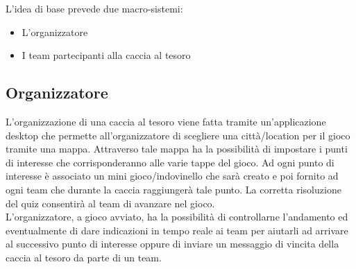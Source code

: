 \documentclass[12pt, english]{report}
\begin{document}
L’idea di base prevede due macro-sistemi:\\
\begin{itemize}
	\item L'organizzatore
	\item I team partecipanti alla caccia al tesoro
\end{itemize}

\subsection*{Organizzatore}
L’organizzazione di una caccia al tesoro viene fatta tramite un’applicazione desktop che permette all'organizzatore di scegliere una città/location per il gioco tramite una mappa. Attraverso tale mappa ha la possibilità di impostare i punti di interesse che corrisponderanno alle varie tappe del gioco. Ad ogni punto di interesse è associato un mini gioco/indovinello che sarà creato e poi fornito ad ogni team che durante la caccia raggiungerà tale punto. La corretta risoluzione del quiz consentirà al team di avanzare nel gioco.\\
L'organizzatore, a gioco avviato, ha la possibilità di controllarne l'andamento ed eventualmente di dare indicazioni in tempo reale ai team per aiutarli ad arrivare al successivo punto di interesse oppure di inviare un messaggio di vincita della caccia al tesoro da parte di un team.\\
\end{document}
